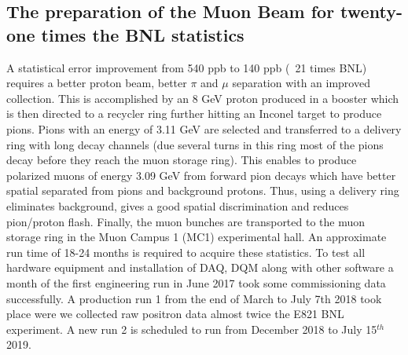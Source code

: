\documentclass[journal,article,submit,moreauthors,pdftex,10pt,a4paper]{Definitions/mdpi}
\begin{document}
\subsection{The preparation of the Muon Beam for twenty-one times the BNL statistics}
A statistical error improvement from 540 ppb to 140 ppb (~21 times BNL) requires a
better proton beam, better $\pi$ and $\mu$ separation with an improved collection.   
This is accomplished by an 8 GeV proton produced in a booster which is then 
directed to a recycler ring further hitting an Inconel target to produce pions. 
Pions with an energy of 3.11 GeV are selected and transferred to a delivery ring with 
long decay channels (due several turns in this ring most of the pions decay 
before they reach the muon storage ring). This enables to produce polarized 
muons of energy 3.09 GeV from forward pion decays which have better spatial separated from 
pions and background protons. Thus, using a delivery ring eliminates background, 
gives a good spatial discrimination and reduces pion/proton flash. Finally, the muon 
bunches are transported to the muon storage ring in the Muon Campus 1 (MC1) experimental hall. 
An approximate run time of 18-24 months is required to acquire these statistics.  
To test all hardware equipment and installation of DAQ, DQM along with other software 
a month of the first engineering run in June 2017 took some commissioning data successfully. 
A production run 1 from the end of March to July 7th 2018 took place were we collected raw 
positron data almost twice the E821 BNL experiment.  
A new run 2 is scheduled to run from December 2018 to July 15$^{th}$ 2019. 
\end{document}
